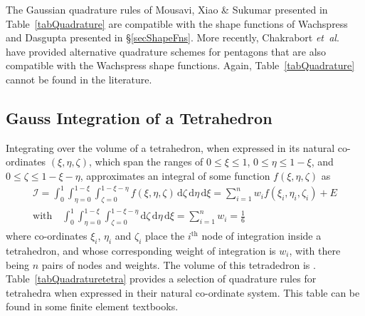 The Gaussian quadrature rules of Mousavi, Xiao \& Sukumar \cite{Mousavietal10} presented in Table~\ref{tabQuadrature} are compatible with the shape functions of Wachspress \cite{Wachspress75,Wachspress16} and Dasgupta \cite{Dasgupta03} presented in \S\ref{secShapeFns}.  More recently, Chakrabort \textit{et~al}.\ \cite{Chakrabortyetal18} have provided alternative quadrature schemes for pentagons that are also compatible with the Wachspress shape functions.  Again, Table~\ref{tabQuadrature} cannot be found in the literature.

\subsection{Gauss Integration of a Tetrahedron}

Integrating over the volume of a tetrahedron, when expressed in its natural co-ordinates $( \xi , \eta , \zeta )$, which span the ranges of $0 \leq \xi \leq 1$, $0 \leq \eta \leq 1 - \xi$, and $0 \leq \zeta \leq 1 - \xi - \eta$, approximates an integral of some function $f ( \xi , \eta , \zeta )$ as
\begin{multline}
     \mathcal{I} = \int_0^1 \int_{\eta=0}^{1-\xi} \int_{\zeta = 0}^{1 - \xi - \eta} 
     f ( \xi , \eta , \zeta ) \, \mathrm{d} \zeta \, \mathrm{d} \eta \, 
     \mathrm{d} \xi = \sum_{i=1}^n w_i f( \xi_i , \eta_i , \zeta_i ) + E \\
     \text{with} \quad 
     \int_0^1 \int_{\eta=0}^{1-\xi} \int_{\zeta = 0}^{1 - \xi - \eta} 
     \mathrm{d} \zeta \, \mathrm{d} \eta \, \mathrm{d} \xi = \sum_{i=1}^n w_i = 
     \frac{1}{6}
\end{multline}
where co-ordinates $\xi_i$, $\eta_i$ and $\zeta_i$ place the $i^{\text{th}}$ node of integration inside a tetrahedron, and whose corresponding weight of integration is $w_i$, with there being $n$ pairs of nodes and weights.  The volume of this tetradedron is .  Table~\ref{tabQuadraturetetra} provides a selection of quadrature rules for tetrahedra when expressed in their natural co-ordinate system.  This table can be found in some finite element textbooks.

